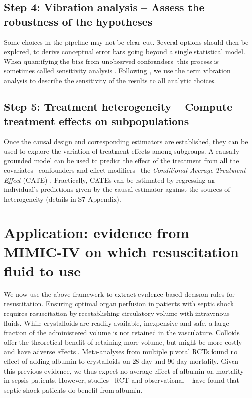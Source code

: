 \documentclass[10pt,letterpaper]{article}
\begin{document}
\subsection*{Step 4: Vibration analysis -- Assess the robustness of the hypotheses}\label{sec:vibration_analysis}

Some choices in the pipeline may not be clear cut. Several options should then
be explored, to derive conceptual error bars going beyond a single statistical
model. When quantifying the bias from unobserved confounders, this process is
sometimes called sensitivity analysis \cite{schneeweiss2006sensitivity,thabane2013tutorial,fda_statistical_2021}.
Following \cite{patel2015assessment}, we use the term vibration analysis to
describe the sensitivity of the results to all analytic choices.

\subsection*{Step 5: Treatment heterogeneity -- Compute treatment effects on subpopulations}\label{sec:treatment_heterogeneity}

Once the causal design and corresponding estimators are established, they can be
used to explore the variation of treatment effects among subgroups. A
causally-grounded model can be used to predict the effect of the treatment from
all the covariates --confounders and effect modifiers-- the \emph{Conditional Average
  Treatment Effect} (CATE) \cite{robertson2021assessing}. Practically, CATEs can be estimated by regressing
an individual's predictions given by the causal estimator against the sources of
heterogeneity (details in S7 Appendix).


\section*{Application: evidence from MIMIC-IV on which resuscitation fluid to use}%
\label{sec:application_on_mimic_iv}

We now use the above framework to extract evidence-based decision rules for
resuscitation. Ensuring optimal organ perfusion in patients with septic shock
requires resuscitation by reestablishing circulatory volume with intravenous
fluids. While crystalloids are readily available, inexpensive and safe, a
large fraction of the administered volume is not retained in the vasculature.
Colloids offer the theoretical benefit of retaining more volume, but might be
more costly and have adverse effects \cite{annane2013effects}. Meta-analyses
from multiple pivotal RCTs found no effect of adding albumin to crystalloids
\cite{xu2014comparison,li2020resuscitation} on 28-day and 90-day mortality.  Given this
previous evidence, we thus expect no average effect of albumin on mortality in
sepsis patients. However, studies --RCT \cite{caironi2014albumin}  and observational
\cite{zhou2021early}-- have
found that septic-shock patients do benefit from albumin.
\end{document}
